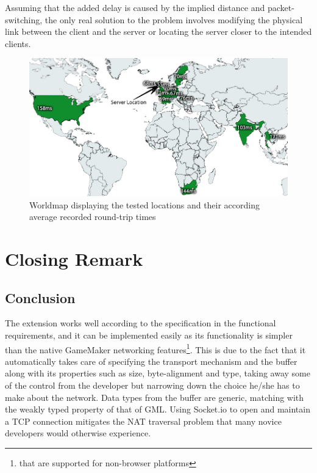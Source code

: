 \documentclass[bsc, 12pt, twoside, singlespacing, parskip, abbrevs, notimes, normalheadings, logo, deptreport]{styles/infthesis}
\begin{document}
Assuming that the added delay is caused by the implied distance and packet-switching, the only real solution to the problem involves modifying the physical link between the client and the server or locating the server closer to the intended clients.

\begin{figure}
\centering
\includegraphics[scale=0.45]{images/worldmap.jpg}
\caption{Worldmap displaying the tested locations and their according average recorded round-trip times}
\label{fig:worldmap}
\end{figure}





\chapter{Closing Remark}
\section{Conclusion}
The extension works well according to the specification in the functional requirements, and it can be implemented easily as its functionality is simpler than the native GameMaker networking features\footnote{that are supported for non-browser platforms}. This is due to the fact that it automatically takes care of specifying the transport mechanism and the buffer along with its properties such as size, byte-alignment and type, taking away some of the control from the developer but narrowing down the choice he/she has to make about the network. Data types from the buffer are generic, matching with the weakly typed property of that of GML. Using Socket.io to open and maintain a TCP connection mitigates the NAT traversal problem that many novice developers would otherwise experience.
\end{document}

